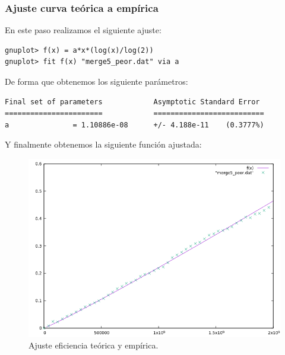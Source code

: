 \subsubsection{Ajuste curva teórica a empírica}

En este paso realizamos el siguiente ajuste:
\begin{shaded*}
\begin{verbatim}
gnuplot> f(x) = a*x*(log(x)/log(2))
gnuplot> fit f(x) "merge5_peor.dat" via a

\end{verbatim}
\end{shaded*}

De forma que obtenemos los siguiente parámetros:

\begin{shaded*}
\begin{verbatim}
Final set of parameters            Asymptotic Standard Error
=======================            ==========================
a               = 1.10886e-08      +/- 4.188e-11    (0.3777%)

\end{verbatim}
\end{shaded*}

Y finalmente obtenemos la siguiente función ajustada:
\begin{figure}[H]
    \begin{center}
        \includegraphics[scale=0.7]{imagenes/m_adj.png}
        \caption{Ajuste eficiencia teórica y empírica.}
        \label{fig13}
    \end{center}
\end{figure}


\newpage


